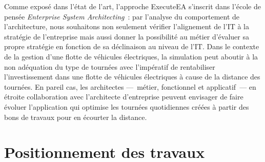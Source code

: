 Comme exposé dans l'état de l'art, l'approche ExecuteEA s'inscrit dans l'école
de pensée \emph{Enterprise System Architecting}~: par l'analyse du comportement
de l'architecture, nous souhaitons non seulement vérifier l'alignement de l'IT à
la stratégie de l'entreprise mais aussi donner la possibilité au métier
d'évaluer sa propre stratégie en fonction de sa déclinaison au niveau de l'IT.
Dans le contexte de la gestion d'une flotte de véhicules électriques, la
simulation peut aboutir à la non adéquation du type de tournées avec l'impératif
de rentabiliser l'investissement dans une flotte de véhicules électriques à
cause de la distance des tournées. En pareil cas, les architectes —~métier,
fonctionnel et applicatif~— en étroite collaboration avec l'architecte
d'entreprise peuvent envisager de faire évoluer l'application qui optimise les tournées quotidiennes 
créées à partir des bons de travaux pour en écourter la distance.




 
%

\section{Positionnement des travaux}
\label{sec:positionnement}





